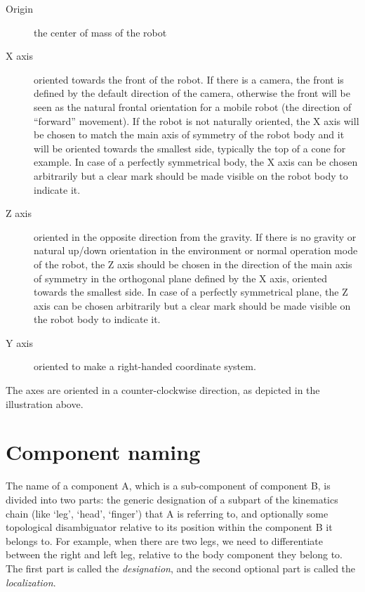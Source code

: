 \documentclass[a4paper]{article}
\begin{document}
\begin{figure}

\end{figure}

\begin{description}
\item[Origin] the center of mass of the robot
\item[X axis] oriented towards the front of the
robot. If there is a camera, the front is defined by the default
direction of the camera, otherwise the front will be seen as the
natural frontal orientation for a mobile robot (the direction of
“forward” movement). If the robot is not naturally oriented, the X axis
will be chosen to match the main axis of symmetry of the robot body and
it will be oriented towards the smallest side, typically the top of a
cone for example. In case of a perfectly symmetrical body, the
X axis can be chosen arbitrarily but a clear mark should be made
visible on the robot body to indicate it.
\item[Z axis] oriented in the opposite direction
from the gravity. If there is no gravity or natural up/down orientation
in the environment or normal operation mode of the robot, the Z axis
should be chosen in the direction of the main axis of symmetry in the
orthogonal plane defined by the X axis, oriented towards the smallest
side. In case of a perfectly symmetrical plane, the Z axis can be
chosen arbitrarily but a clear mark should be made visible on the robot
body to indicate it.
\item[Y axis] oriented to make a right-handed
coordinate system.
\end{description}


The axes are oriented in a counter-clockwise direction, as depicted in
the illustration above.

\section{Component naming}

The name of a component A, which is a sub-component of component
B, is divided into two parts: the generic designation of a subpart of
the kinematics chain (like ‘leg’, ‘head’, ‘finger’) that A is referring
to, and optionally some topological disambiguator relative to its
position within the component B it belongs to. For example, when there
are two legs, we need to differentiate between the right and left leg,
relative to the body component they belong to. The first part is called
the \textit{designation}, and the second optional
part is called the \textit{localization}.
\end{document}
